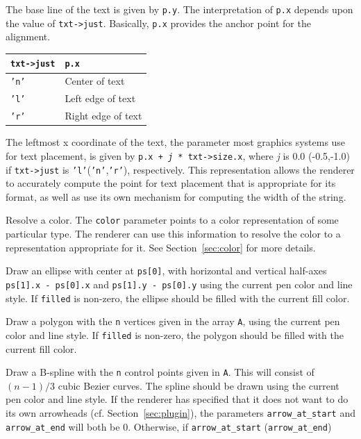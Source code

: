 \begin{description}
The base line of the text is given by {\tt p.y}. The interpretation
of {\tt p.x} depends upon the value of {\tt txt->just}. Basically,
{\tt p.x} provides the anchor point for the alignment.
\begin{center}
\begin{tabular}{ll}
{\tt txt->just} & {\tt p.x} \\ \hline
{\tt 'n'} & Center of text \\
{\tt 'l'} & Left edge of text \\
{\tt 'r'} & Right edge of text \\
\end{tabular}
\end{center}
The leftmost x coordinate of the text, the parameter most graphics
systems use for text placement, is given by 
{\tt p.x + {\em j} * txt->size.x}, where {\em j} is 0.0 (-0.5,-1.0)
if {\tt txt->just} is {\tt 'l'}({\tt 'n'},{\tt 'r'}), respectively.
This representation allows the renderer to accurately compute
the point for text placement that is appropriate for its format, as
well as use its own mechanism for computing the width of the string.
\item[{\tt resolve\_color(job, color)}]
Resolve a color. The {\tt color} parameter points to a color representation
of some particular type. The renderer can use this information to resolve
the color to a representation appropriate for it. See Section~\ref{sec:color}
for more details.
\item[{\tt ellipse(job, ps, filled)}]
Draw an ellipse with center at {\tt ps[0]}, with horizontal and vertical 
half-axes {\tt ps[1].x - ps[0].x} and {\tt ps[1].y - ps[0].y} 
using the current pen color and line style.
If {\tt filled} is non-zero, the ellipse should be filled with the current
fill color.
\item[{\tt polygon(job, A, n, filled)}]
Draw a polygon with the {\tt n} vertices given in the array {\tt A}, 
using the current pen color and line style.
If {\tt filled} is non-zero, the polygon should be filled with the current
fill color.
\item[{\tt beziercurve(job, A, n, arrow\_at\_start, arrow\_at\_end, filled)}]
Draw a B-spline with the {\tt n} control points given in {\tt A}. This will
consist of $(n - 1)/3$ cubic Bezier curves. The spline should be drawn
using the current pen color and line style.
If the renderer has specified that it does not want to do its own arrowheads
(cf. Section~\ref{sec:plugin}),
the parameters 
{\tt arrow\_at\_start} and {\tt arrow\_at\_end}
will both be 0. Otherwise, if {\tt arrow\_at\_start} ({\tt arrow\_at\_end}) 

\end{description}
